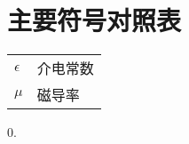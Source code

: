 
\chapter{主要符号对照表}
\label{chap:symb}


\begin{center}
	

\vspace{1cm}
\begin{tabular}{ll}

$\epsilon$       & \hspace{5em}介电常数 \\
$\mu$ \qquad     & \hspace{5em}磁导率 \\


\end{tabular}


\end{center}
0.
